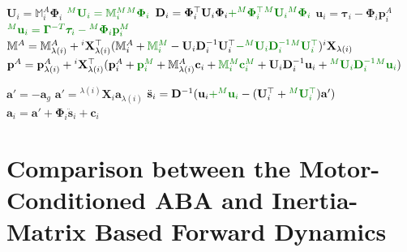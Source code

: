 \begin{algorithm}
\begin{algorithmic}[1]
        \item[]
        \State $\mathbf{U}_i = \mathbb{M}_i ^A \boldsymbol{\Phi}_i$
        \State $\color{webgreen}{{}^M\mathbf{U}_i = \mathbb{M}_i ^M {}^M\boldsymbol{\Phi}_i}$
        \State $\mathbf{D} _i = \boldsymbol{\Phi} ^\top _i  {} \mathbf{U} _i \boldsymbol{\Phi} _i \textcolor{webgreen}{+ {} ^M\boldsymbol{\Phi} ^\top _i  {} ^M\mathbf{U} _i {} ^M\boldsymbol{\Phi} _i}$
        \State $\mathbf{u}_i = \boldsymbol{\tau}_i - \boldsymbol{\Phi}_i\mathbf{p}_i^A$
        \State $\color{webgreen}{{}^M\mathbf{u}_i = \boldsymbol{\Gamma}^{-T}\boldsymbol{\tau}_i - {}^M\boldsymbol{\Phi}_i\mathbf{p}_i^M}$
        \State $\mathbb{M} ^A = \mathbb{M} ^A _{\lambda (i)} + {}^i\mathbf{X} _{\lambda (i)} ^\top (\mathbb{M} _i ^A + \textcolor{webgreen}{\mathbb{M} _i ^M } - {}  \mathbf{U} _i  \mathbf{D} ^{-1} _i  {}  \mathbf{U} ^\top _i \textcolor{webgreen}{- {} ^M \mathbf{U} _i  \mathbf{D} ^{-1} _i {} ^M \mathbf{U} ^\top _i}) {} ^i \mathbf{X} _{\lambda (i)} $
        \State $\mathbf{p} ^A = \mathbf{p} ^A _{\lambda (i)} + {}^i\mathbf{X} _{\lambda (i)} ^\top (\mathbf{p} ^A_i + \textcolor{webgreen}{\mathbf{p} ^M_i } + \mathbb{M} ^A _{\lambda (i)}  \mathbf{c}_i + \textcolor{webgreen}{\mathbb{M} {} ^M _i \mathbf{c} ^M _i }+ {}  \mathbf{U} _i \mathbf{D} ^{-1} _i {} \mathbf{u} _i + \textcolor{webgreen}{{} ^M \mathbf{U} _i \mathbf{D} ^{-1} _i {} ^M\mathbf{u} _i}) $
        \EndIf
        \EndFor

        \item[]
        \State $\mathbf{a}' = -\mathbf{a}_g$
        \Else
        \State $\mathbf{a}' = {}^{\lambda(i)}\mathbf{X}_i \mathbf{a}_{\lambda(i)}$
        \State $\ddot{\mathbf{s}}_i = \mathbf{D}^{-1} (\mathbf{u}_i \textcolor{webgreen}{+ {}^M\mathbf{u}_i }- (\mathbf{U}_i^\top + \textcolor{webgreen}{{}^M\mathbf{U}_i^\top})\mathbf{a}')$
        \State $\mathbf{a}_i = \mathbf{a}' + \boldsymbol{\Phi}_i\mathbf{\ddot{s}}_i + \mathbf{c} _i$
        \EndIf
        \EndFor
    \end{algorithmic}
\end{algorithm}

\section{Comparison between the Motor-Conditioned ABA and Inertia-Matrix Based Forward Dynamics}

